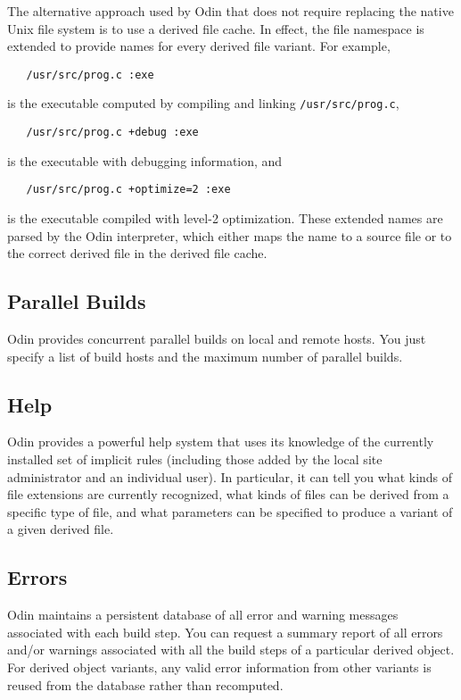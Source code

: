 \documentclass[hidelinks]{report}
\newcommand{\ex}{\tt}   %
\begin{document}
The alternative approach used by Odin
that does not require replacing the native Unix file system
is to use a derived file cache.
In effect, the file namespace is extended to provide names for
every derived file variant.
For example,
\begin{verbatim}
   /usr/src/prog.c :exe
\end{verbatim}
is the executable computed by compiling and linking {\ex /usr/src/prog.c},
\begin{verbatim}
   /usr/src/prog.c +debug :exe
\end{verbatim}
is the executable with debugging information, and
\begin{verbatim}
   /usr/src/prog.c +optimize=2 :exe
\end{verbatim}
is the executable compiled with level-2 optimization.
These extended names are parsed by the Odin interpreter,
which either maps the name to a source file
or to the correct derived file in the derived file cache.

\subsection{Parallel Builds}
Odin provides concurrent parallel builds on local and remote hosts.
You just specify a list of build hosts and the maximum number of parallel
builds.

\subsection{Help}
Odin provides a powerful help system that uses its knowledge of the
currently installed set of implicit rules (including those added by
the local site administrator and an individual user).
In particular, it can tell you what kinds of
file extensions are currently recognized,
what kinds of files can be derived from a specific type of file,
and what parameters can be specified to produce a variant of a
given derived file.

\subsection{Errors}
Odin maintains a persistent database of all error and warning messages
associated with each build step.
You can request a summary report of all errors and/or warnings
associated with all the build steps of a particular derived object.
For derived object variants,
any valid error information from other variants is reused from the
database rather than recomputed.
\end{document}
